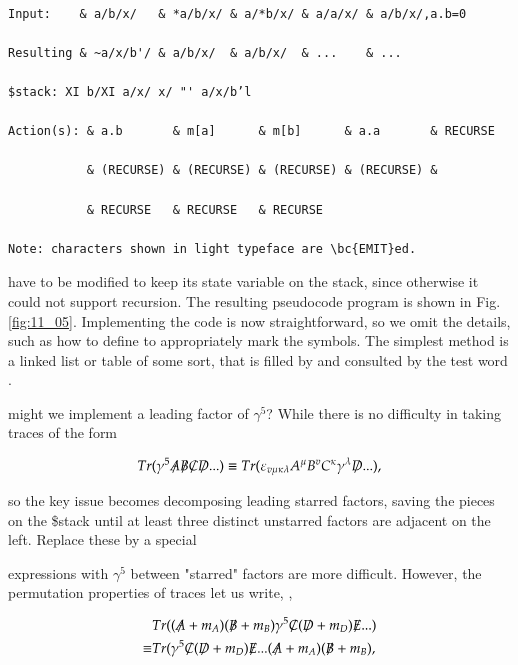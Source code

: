 \begin{verbatim}

Input:    & a/b/x/   & *a/b/x/ & a/*b/x/ & a/a/x/ & a/b/x/,a.b=0

Resulting & ~a/x/b'/ & a/b/x/  & a/b/x/  & ...    & ...

$stack: XI b/XI a/x/ x/ "' a/x/b’l

Action(s): & a.b       & m[a]      & m[b]      & a.a       & RECURSE

           & (RECURSE) & (RECURSE) & (RECURSE) & (RECURSE) &

           & RECURSE   & RECURSE   & RECURSE

Note: characters shown in light typeface are \bc{EMIT}ed.
\end{verbatim}

have to be modified to keep its state variable on the stack, since otherwise it could not support recursion. The resulting pseudocode program is shown in Fig. \ref{fig:11_05}. Implementing the code is now straightforward, so we omit the details, such as how to define  to appropriately mark the symbols. The simplest method is a linked list or table of some sort, that is filled by  and consulted by the test word .


 might we implement a leading factor of $\gamma^{5}$? While there is no difficulty in taking traces of the form

\begin{equation}
Tr( \gamma^{5} \tr{A} \tr{B} \tr{C} \tr{D} ...) \equiv Tr(\varepsilon_{v\mu\kappa\lambda} A^{\mu} B^{v} C^{\kappa} \gamma^{\lambda} \tr{D} ...),
\end{equation}



so the key issue becomes decomposing leading starred factors, saving the pieces on the \$stack until at least three distinct unstarred factors are adjacent on the left. Replace these by a special 

expressions with $\gamma^{5}$ between "starred" factors are more difficult. However, the permutation properties of traces let us write, \eg,

\begin{align}
& Tr( (\tr{A} + m_{A})(\tr{B} + m_{B})\gamma^{5} \tr{C}(\tr{D} + m_{D})\tr{E} ... ) \\
\equiv & Tr(\gamma^{5}\tr{C}(\tr{D} + m_{D})\tr{E} ... (\tr{A} + m_{A})(\tr{B} + m_{B}) ,
\end{align}

